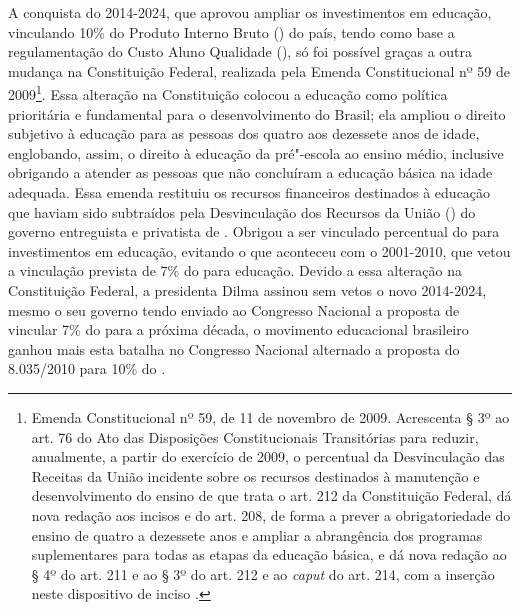 A conquista do  2014-2024, que aprovou ampliar os investimentos em
educação, vinculando 10\% do Produto Interno Bruto () do país, tendo
como base a regulamentação do Custo Aluno Qualidade (), só foi
possível graças a outra mudança na Constituição Federal, realizada pela
Emenda Constitucional nº 59 de 2009\footnote{Emenda
  Constitucional nº 59, de 11 de novembro de 2009. Acrescenta § 3º ao
  art. 76 do Ato das Disposições Constitucionais Transitórias para
  reduzir, anualmente, a partir do exercício de 2009, o percentual da
  Desvinculação das Receitas da União incidente sobre os recursos
  destinados à manutenção e desenvolvimento do ensino de que trata o
  art. 212 da Constituição Federal, dá nova redação aos incisos  e 
  do art. 208, de forma a prever a obrigatoriedade do ensino de quatro a
  dezessete anos e ampliar a abrangência dos programas suplementares
  para todas as etapas da educação básica, e dá nova redação ao § 4º do
  art. 211 e ao § 3º do art. 212 e ao \emph{caput} do art. 214, com a
  inserção neste dispositivo de inciso .}. Essa alteração na
Constituição colocou a educação como política prioritária e fundamental
para o desenvolvimento do Brasil; ela ampliou o direito subjetivo à
educação para as pessoas dos quatro aos dezessete anos de idade,
englobando, assim, o direito à educação da pré"-escola ao ensino médio,
inclusive obrigando a atender as pessoas que não concluíram a educação
básica na idade adequada. Essa emenda restituiu os recursos financeiros
destinados à educação que haviam sido subtraídos pela Desvinculação dos
Recursos da União () do governo entreguista e privatista de .
Obrigou a ser vinculado percentual do  para investimentos
em educação, evitando o que aconteceu com o  2001-2010, que  vetou
a vinculação prevista de 7\% do  para educação. Devido a essa
alteração na Constituição Federal, a presidenta Dilma assinou sem vetos
o novo  2014-2024, mesmo o seu governo tendo enviado ao Congresso
Nacional a proposta de vincular 7\% do  para a próxima década, o
movimento educacional brasileiro ganhou mais esta batalha no Congresso
Nacional alternado a proposta do  8.035/2010 para 10\% do .

